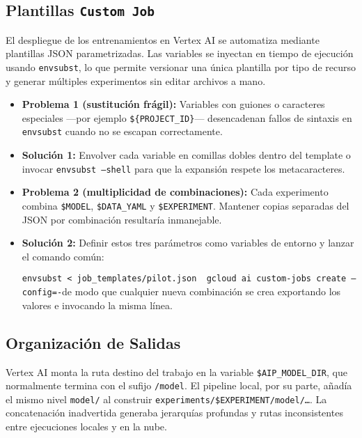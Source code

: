 \subsection{Plantillas \texttt{Custom Job}}\label{ssec:job_templates}

El despliegue de los entrenamientos en Vertex AI se automatiza mediante plantillas JSON parametrizadas.
Las variables se inyectan en tiempo de ejecución usando \texttt{envsubst}, lo que permite versionar una única plantilla por tipo de recurso y generar múltiples experimentos sin editar archivos a mano.

\begin{itemize}
   \item \textbf{Problema 1 (sustitución frágil):}
   Variables con guiones o caracteres especiales —por ejemplo \verb|${PROJECT_ID}|— desencadenan fallos de sintaxis en \texttt{envsubst} cuando no se escapan correctamente.
   \item \textbf{Solución 1:}
   Envolver cada variable en comillas dobles dentro del template o invocar \texttt{envsubst --shell} para que la expansión respete los metacaracteres.
   \item \textbf{Problema 2 (multiplicidad de combinaciones):}
   Cada experimento combina \verb|$MODEL|, \verb|$DATA_YAML| y \verb|$EXPERIMENT|.
   Mantener copias separadas del JSON por combinación resultaría inmanejable.
   \item \textbf{Solución 2:}
   Definir estos tres parámetros como variables de entorno y lanzar el comando común:\par
   \texttt{envsubst < job\_templates/pilot.json \textbar\ gcloud ai custom-jobs create --config=-}\quad de modo que cualquier nueva combinación se crea exportando los valores e invocando la misma línea.
\end{itemize}

\subsection{Organización de Salidas}\label{ssec:dirs}

Vertex AI monta la ruta destino del trabajo en la variable \verb|$AIP_MODEL_DIR|, que normalmente termina con el sufijo \texttt{/model}.
El pipeline local, por su parte, añadía el mismo nivel \texttt{model/} al construir \texttt{experiments/\$EXPERIMENT/model/…}.
La concatenación inadvertida generaba jerarquías profundas y rutas inconsistentes entre ejecuciones locales y en la nube.

